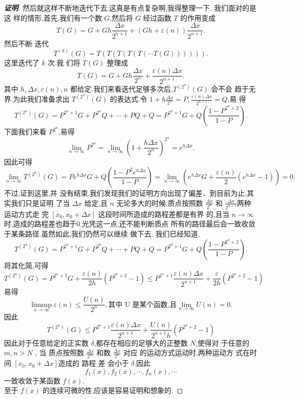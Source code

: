 \documentclass[a4paper]{article}
\begin{document}
\begin{proof}[\textbf{证明}]
然后就这样不断地迭代下去.这真是有点复杂啊,我得整理一下. 我们面对的是这
样的情形,首先,我们有一个数 $G$,然后将 $G$ 经过函数 $T$ 的作用变成 $$ T(G)=G+Gh\frac{\Delta
  x}{2^{n+1}}+(Gh+\varepsilon(n))\frac{\Delta x}{2^{n+1}}. $$ 然后不断
迭代 $$ T^{(k)}(G)=T(T(T(T(T(\cdots T(G)))))). $$ 这里迭代了 $k$ 次.我
们将 $T(G)$ 整理成 $$ T(G)=G+Gh\frac{\Delta
  x}{2^{n}}+\frac{\varepsilon(n)\Delta x}{2^{n+1}}. $$ 其中 $h,\Delta
x,\varepsilon(n),n$ 都给定.我们来看迭代足够多次后,$T^{(2^n)}(G)$ 会不会
趋于无界.为此我们准备求出 $T^{(2^n)}(G)$ 的表达式.令 $1+h\frac{\Delta
  x}{2^n}=P,\frac{\varepsilon(n)\Delta x}{2^{n+1}}=Q$,易
得 \begin{equation} T^{(2^n)}(G)=P^{2^n+1}G+P^
  {2^n}Q+\cdots+PQ+Q=P^{2^n+1}G+Q(\frac{1-P^{2^n+2}}{1-P}). \end{equation}
下面我们来看 $P^{2^n}$,易得 $$
\lim_{n\to\infty}P^{2^n}=\lim_{n\to\infty}(1+\frac{h\Delta
  x}{2^n})^{2^n}=e^{h\Delta x}. $$ 因此可得 $$
\lim_{n\to\infty}T^{(2^n)}(G)=Pe^{h\Delta x}G+Q(\frac{1-P^2e^{h\Delta
    x}}{1-P})=\lim_{n\to\infty}(e^{h\Delta
  x}G+\frac{\varepsilon(n)}{2}(e^{h\Delta x}-1))=0. $$ 不过,证到这里,并
没有结束.我们发现我们的证明方向出现了偏差．到目前为止,其实我们只是证明
了当 $\Delta x$ 给定,且 $n$ 无论多大的时候,质点按照数 $\frac{\Delta
  x}{2^n}$ 和 $\frac{\Delta x}{2^{n+1}}$两种运动方式走
完 $[x_0,x_0+\Delta x]$ 这段时间所造成的路程差都是有界
的,且当 $n\to\infty$ 时,造成的路程差也趋于0.光凭这一点,还不能判断质点
所有的路径最后会一致收敛于某条路径.虽然如此,我们仍然可以继续
做下去. 我们已经知道, \begin{equation} T^{(2^n)}(G)=P^{2^n+1}G+P^
  {2^n}Q+\cdots+PQ+Q=P^{2^n+1}G+Q(\frac{1-P^{2^n+2}}{1-P}). \end{equation}
将其化简,可得 $$
T^{(2^n)}(G)=P^{2^n+1}G+\frac{\varepsilon(n)}{2h}(P^{2^n+2}-1)\leq
P^{2^n+1}\frac{\varepsilon(n)\Delta
  x}{2^{n+1}}+\frac{\varepsilon}{2h}(P^{2^n+2}-1) $$ 易得 $$
\limsup_{n\to\infty}\varepsilon(n) \leq \frac{U(n)}{2^n}, \mbox{其中 U
  是某个函数,且} \lim_{n\to\infty}U(n)=0.$$ 因此
$$
T^{(2^n)}(G)\leq P^{2^n+1}\frac{\varepsilon(n)\Delta
  x}{2^{n+1}}+\frac{U(n)}{2^{n+1}h}(P^{2^n+2}-1)
$$
因此对于任意给定的正实数 $\delta$,都存在相应的足够大的正整数 $N$,使得对
于任意的 $m,n > N $ , 当 质点按照数 $\frac{\Delta
  x}{2^m}$ 和数 $\frac{\Delta x}{2^n}$ 对应 的运动方式运动时,两种运动方
式在时间 $[x_0,x_0+\Delta x]$造成的 路程 差 会小于 $\delta$.因此
$$
f_1(x),f_2(x),\cdots,f_n(x),\cdots
$$
一致收敛于某函数 $f(x)$.\\

至于 $f(x)$ 的连续可微的性,应该是容易证明和想象的.
\end{proof}
\end{document}
